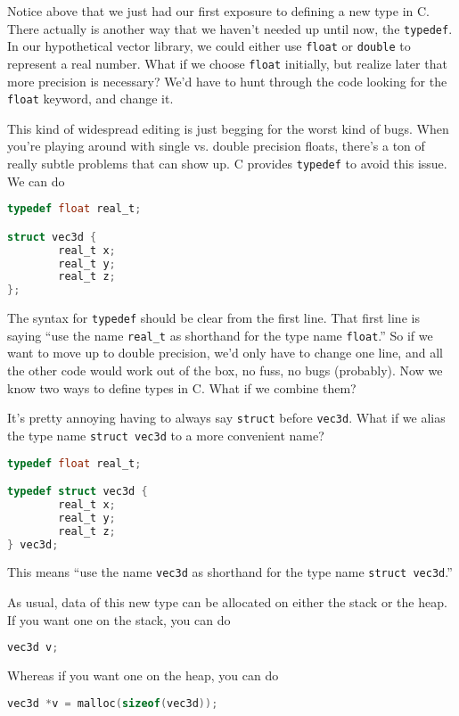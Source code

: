 \documentclass[ebook,11pt,oneside,openany]{memoir}
\newcommand{\cf}[1]{\texttt{#1}}
\begin{document}
Notice above that we just had our first exposure to defining a new type in C. There actually is another way that we haven't needed up until now, the \texttt{typedef}. In our hypothetical vector library, we could either use \texttt{float} or \texttt{double} to represent a real number. What if we choose \texttt{float} initially, but realize later that more precision is necessary? We'd have to hunt through the code looking for the \texttt{float} keyword, and change it. 


\noindent
This kind of widespread editing is just begging for the worst kind of bugs. When you're playing around with single vs. double precision floats, there's a ton of really subtle problems that can show up. C provides \texttt{typedef} to avoid this issue. We can do 


\begin{lstlisting}[language=C]
typedef float real_t;

struct vec3d {
        real_t x;
        real_t y;
        real_t z;
};
\end{lstlisting}

The syntax for \cf{typedef} should be clear from the first line. That first line is saying ``use the name \cf{real\_t} as shorthand for the type name \cf{float}.'' So if we want to move up to double precision, we'd only have to change one line, and all the other code would work out of the box, no fuss, no bugs (probably). Now we know two ways to define types in C. What if we combine them?

It's pretty annoying having to always say \cf{struct} before \cf{vec3d}. What if we alias the type name \cf{struct vec3d} to a more convenient name?

\begin{lstlisting}[language=C]
typedef float real_t;

typedef struct vec3d {
        real_t x;
        real_t y;
        real_t z;
} vec3d;
\end{lstlisting}
This means ``use the name \cf{vec3d} as shorthand for the type name \cf{struct vec3d}.''

As usual, data of this new type can be allocated on either the stack or the heap. If you want one on the stack, you can do

\begin{lstlisting}[language=C]
vec3d v;
\end{lstlisting}

Whereas if you want one on the heap, you can do

\begin{lstlisting}[language=C]
vec3d *v = malloc(sizeof(vec3d));
\end{lstlisting}
\end{document}
